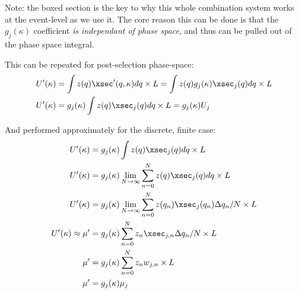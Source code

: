     Note: the boxed section is the key to why this whole combination system works at the event-level as we use it.
    The core reason this can be done is that the $g_j(\kappa)$ coefficient
        \textit{is independant of phase space},
        and thus can be pulled out of the phase space integral.


    This can be repeated for post-selection phase-space:
    \begin{equation} \begin{split}
        U'(\kappa) &= \int z(q) \xsec'(q,\kappa) dq \times L = \int z(q) g_j(\kappa) \xsec_{j}(q) dq \times L \\
        U'(\kappa) &= g_j(\kappa) \int z(q) \xsec_{j}(q) dq \times L = g_j(\kappa) U_j
    \end{split} \end{equation}

    And performed approximately for the discrete, finite case:
    \begin{equation} \begin{split}
        U'(\kappa) &= g_j(\kappa) \int z(q) \xsec_{j}(q) dq \times L \\
        U'(\kappa) &= g_j(\kappa) \lim\limits_{N\to\infty} \sum\limits_{n=0}^{N} z(q) \xsec_{j}(q) dq \times L \\
        U'(\kappa) &= g_j(\kappa) \lim\limits_{N\to\infty} \sum\limits_{n=0}^{N} z(q_n) \xsec_{j}(q_n) \Delta q_n / N \times L \\
        U'(\kappa) \approx \mu' &= g_j(\kappa) \sum\limits_{n=0}^{N} z_n \xsec_{j,n} \Delta q_n / N \times L \\
        \mu' &= g_j(\kappa) \sum\limits_{n=0}^{N} z_n w_{j,n} \times L \\
        \mu' &= g_j(\kappa) \mu_j
    \end{split} \end{equation}










